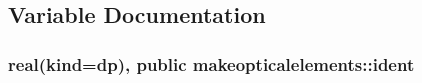 \subsection{Variable Documentation}
\subsubsection[{\texorpdfstring{ident}{ident}}]{\setlength{\rightskip}{0pt plus 5cm}real(kind=dp), public makeopticalelements\+::ident}\hypertarget{namespacemakeopticalelements_ab4e48a98a0fb0756bb4eff6ece9623a8}{}\label{namespacemakeopticalelements_ab4e48a98a0fb0756bb4eff6ece9623a8}
